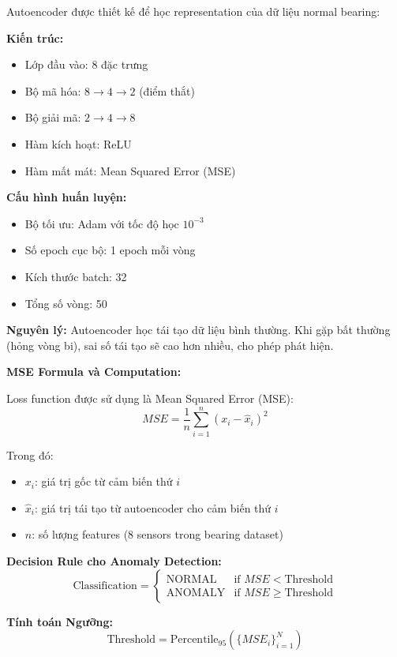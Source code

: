 Autoencoder được thiết kế để học representation của dữ liệu normal bearing:

\textbf{Kiến trúc:}
\begin{itemize}
    \item Lớp đầu vào: 8 đặc trưng
    \item Bộ mã hóa: $8 \rightarrow 4 \rightarrow 2$ (điểm thắt)
    \item Bộ giải mã: $2 \rightarrow 4 \rightarrow 8$
    \item Hàm kích hoạt: ReLU
    \item Hàm mất mát: Mean Squared Error (MSE)
\end{itemize}

\textbf{Cấu hình huấn luyện:}
\begin{itemize}
    \item Bộ tối ưu: Adam với tốc độ học $10^{-3}$
    \item Số epoch cục bộ: 1 epoch mỗi vòng
    \item Kích thước batch: 32
    \item Tổng số vòng: 50
\end{itemize}

\textbf{Nguyên lý:} Autoencoder học tái tạo dữ liệu bình thường. Khi gặp bất thường (hỏng vòng bi), sai số tái tạo sẽ cao hơn nhiều, cho phép phát hiện.

\textbf{MSE Formula và Computation:}

Loss function được sử dụng là Mean Squared Error (MSE):
$$MSE = \frac{1}{n} \sum_{i=1}^{n} (x_i - \hat{x}_i)^2$$

Trong đó:
\begin{itemize}
    \item $x_i$: giá trị gốc từ cảm biến thứ $i$
    \item $\hat{x}_i$: giá trị tái tạo từ autoencoder cho cảm biến thứ $i$
    \item $n$: số lượng features (8 sensors trong bearing dataset)
\end{itemize}

\textbf{Decision Rule cho Anomaly Detection:}
$$\text{Classification} = \begin{cases} 
\text{NORMAL} & \text{if } MSE < \text{Threshold} \\
\text{ANOMALY} & \text{if } MSE \geq \text{Threshold}
\end{cases}$$

\textbf{Tính toán Ngưỡng:}
$$\text{Threshold} = \text{Percentile}_{95}(\{MSE_i\}_{i=1}^{N})$$

